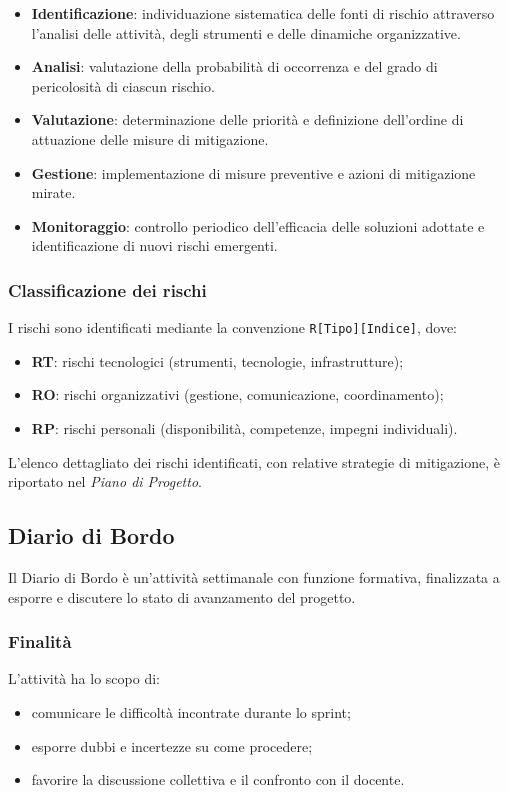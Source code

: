 \documentclass[a4paper, 11pt, oneside]{scrartcl} %
\begin{document}
\begin{itemize}
    \item \textbf{Identificazione}: individuazione sistematica delle fonti di rischio attraverso l'analisi delle attività, degli strumenti e delle dinamiche organizzative.
    \item \textbf{Analisi}: valutazione della probabilità di occorrenza e del grado di pericolosità di ciascun rischio.
    \item \textbf{Valutazione}: determinazione delle priorità e definizione dell'ordine di attuazione delle misure di mitigazione.
    \item \textbf{Gestione}: implementazione di misure preventive e azioni di mitigazione mirate.
    \item \textbf{Monitoraggio}: controllo periodico dell'efficacia delle soluzioni adottate e identificazione di nuovi rischi emergenti.
\end{itemize}

\subsubsection{Classificazione dei rischi}
I rischi sono identificati mediante la convenzione \texttt{R[Tipo][Indice]}, dove:
\begin{itemize}
    \item \textbf{RT}: rischi tecnologici (strumenti, tecnologie, infrastrutture);
    \item \textbf{RO}: rischi organizzativi (gestione, comunicazione, coordinamento);
    \item \textbf{RP}: rischi personali (disponibilità, competenze, impegni individuali).
\end{itemize}

\noindent
L'elenco dettagliato dei rischi identificati, con relative strategie di mitigazione, è riportato nel \emph{Piano di Progetto}.

\subsection{Diario di Bordo}
Il Diario di Bordo è un'attività settimanale con funzione formativa, finalizzata a esporre e discutere lo stato di avanzamento del progetto.

\subsubsection{Finalità}
L'attività ha lo scopo di:
\begin{itemize}
    \item comunicare le difficoltà incontrate durante lo sprint;
    \item esporre dubbi e incertezze su come procedere;
    \item favorire la discussione collettiva e il confronto con il docente.
\end{itemize}
\end{document}
